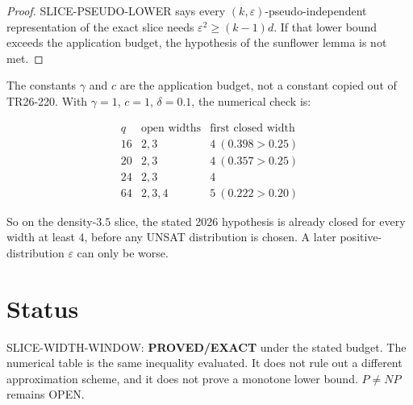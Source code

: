 \documentclass[11pt]{article}
\begin{document}
\begin{proof}
SLICE-PSEUDO-LOWER says every $(k,\varepsilon)$-pseudo-independent representation of the exact slice needs $\varepsilon^2\ge (k-1)d$. If that lower bound exceeds the application budget, the hypothesis of the sunflower lemma is not met.
\end{proof}

The constants $\gamma$ and $c$ are the application budget, not a constant copied out of TR26-220. With $\gamma=1$, $c=1$, $\delta=0.1$, the numerical check is:

\[
\begin{array}{c|c|c}
q&\text{open widths}&\text{first closed width}\\
\hline
16&2,3&4\ (0.398>0.25)\\
20&2,3&4\ (0.357>0.25)\\
24&2,3&4\\
64&2,3,4&5\ (0.222>0.20)
\end{array}
\]

So on the density-$3.5$ slice, the stated 2026 hypothesis is already closed for every width at least $4$, before any UNSAT distribution is chosen. A later positive-distribution $\varepsilon$ can only be worse.

\section{Status}
SLICE-WIDTH-WINDOW: \textbf{PROVED/EXACT} under the stated budget. The numerical table is the same inequality evaluated. It does not rule out a different approximation scheme, and it does not prove a monotone lower bound. $P\ne NP$ remains OPEN.
\end{document}
